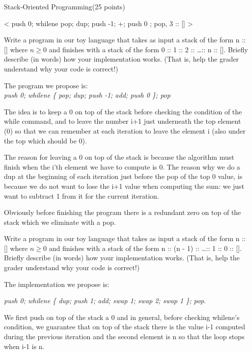 \documentclass{article}
\begin{document}
\begin{question}{Stack-Oriented Programming}{(25 points)}
\begin{subquestion}
  \end{subquestion}

  \begin{subquestion}
    < push 0; whilene { pop; dup; push -1; +; push 0 }; pop, 3 :: [] >
  \end{subquestion}
  
  \begin{subquestion}
 Write a program in our toy language that takes as input a stack of the form n :: [] where $n \geq 0$ and
finishes with a stack of the form 0 :: 1 :: 2 :: \dots :: n :: []. Briefly describe (in words) how your
implementation works. (That is, help the grader understand why your code is correct!)

The program we propose is:\\
 \emph{push 0; whilene \{ pop; dup; push -1; add; push 0 \}; pop}
 
 The idea is to keep a 0 on top of the stack before checking the condition of the while command, and to leave the number i+1 just underneath the top element (0) so that we can remember at each iteration to leave the element i (also under the top which should be 0).
 
 The reason for leaving a 0 on top of the stack is because the algorithm must finish when the i'th element we have to compute is 0. The reason why we do a dup at the beginning of each iteration just before the pop of the top 0 value, is because we do not want to lose the i+1 value when computing the sum: we just want to subtract 1 from it for the current iteration.
 
 Obviously before finishing the program there is a redundant zero on top of the stack which we eliminate with a pop. 


  \end{subquestion}
  
  \begin{subquestion}
    Write a program in our toy language that takes as input a stack of the form n :: [] where $n \geq 0$ and
   finishes with a stack of the form n :: (n - 1) :: \dots :: 1 :: 0 :: []. Briefly describe (in words) how your
   implementation works. (That is, help the grader understand why your code is correct!)
   
   The implementation we propose is:
   
   \emph{push 0; whilene \{ dup; push 1; add; swap 1; swap 2; swap 1 \}; pop}.
   
   We first push on top of the stack a 0 and in general, before checking whilene's condition, we guarantee that on top of the stack there is the value i-1 computed during the previous iteration and the second element is n so that the loop stops when i-1 is n.
   

\end{subquestion}
\end{question}
\end{document}
